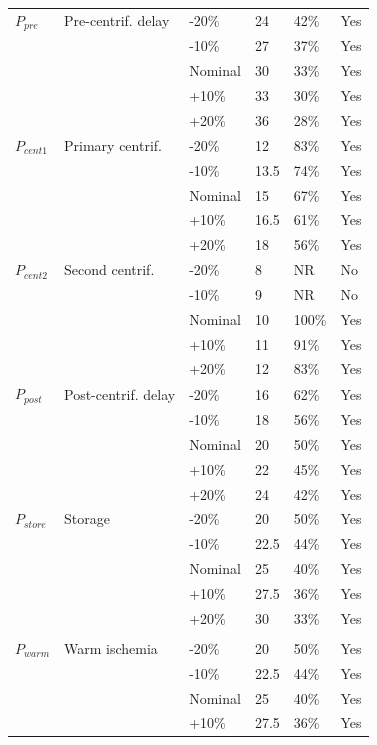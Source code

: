 \documentclass[preprint,12pt]{elsarticle}
\begin{document}
\begin{longtable}{@{}C{1.75cm} L{3.25cm} C{1.45cm} R{1.15cm} R{1.25cm} C{1.30cm}@{}}
\addlinespace[0.35em] \\ \midrule
$P_{pre}$ & Pre-centrif. delay & -20\% & 24 & 42\% & Yes \\
 &  & -10\% & 27 & 37\% & Yes \\
 &  & Nominal & 30 & 33\% & Yes \\
 &  & +10\% & 33 & 30\% & Yes \\
 &  & +20\% & 36 & 28\% & Yes \\
\addlinespace[0.16em]
$P_{cent1}$ & Primary centrif. & -20\% & 12 & 83\% & Yes \\
 &  & -10\% & 13.5 & 74\% & Yes \\
 &  & Nominal & 15 & 67\% & Yes \\
 &  & +10\% & 16.5 & 61\% & Yes \\
 &  & +20\% & 18 & 56\% & Yes \\
\addlinespace[0.16em]
$P_{cent2}$ & Second centrif. & -20\% & 8 & NR & No \\
 &  & -10\% & 9 & NR & No \\
 &  & Nominal & 10 & 100\% & Yes \\
 &  & +10\% & 11 & 91\% & Yes \\
 &  & +20\% & 12 & 83\% & Yes \\
\addlinespace[0.16em]
$P_{post}$ & Post-centrif. delay & -20\% & 16 & 62\% & Yes \\
 &  & -10\% & 18 & 56\% & Yes \\
 &  & Nominal & 20 & 50\% & Yes \\
 &  & +10\% & 22 & 45\% & Yes \\
 &  & +20\% & 24 & 42\% & Yes \\
\addlinespace[0.16em]
$P_{store}$ & Storage & -20\% & 20 & 50\% & Yes \\
 &  & -10\% & 22.5 & 44\% & Yes \\
 &  & Nominal & 25 & 40\% & Yes \\
 &  & +10\% & 27.5 & 36\% & Yes \\
 &  & +20\% & 30 & 33\% & Yes \\
\addlinespace[0.16em]
\midrule
\addlinespace[0.35em] \\ \midrule
$P_{warm}$ & Warm ischemia & -20\% & 20 & 50\% & Yes \\
 &  & -10\% & 22.5 & 44\% & Yes \\
 &  & Nominal & 25 & 40\% & Yes \\
 &  & +10\% & 27.5 & 36\% & Yes \\

\end{longtable}
\end{document}
